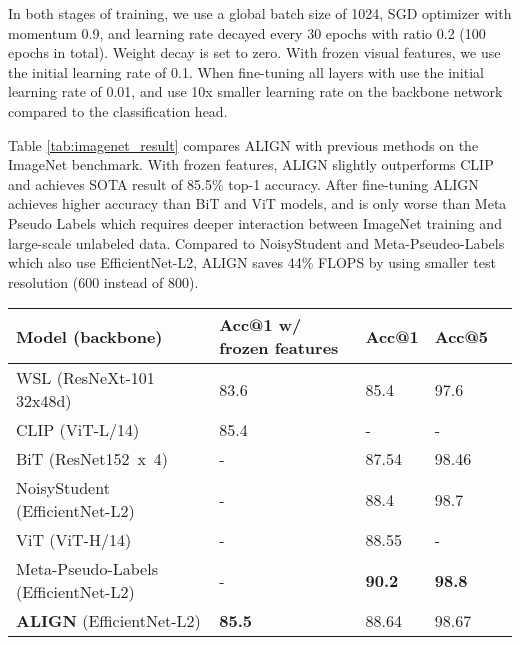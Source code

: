 \documentclass{article}
\begin{document}
In both stages of training, we use a global batch size of 1024, SGD optimizer with momentum 0.9, and learning rate decayed every 30 epochs with ratio 0.2 (100 epochs in total). Weight decay is set to zero. With frozen visual features, we use the initial learning rate of 0.1. When fine-tuning all layers with use the initial learning rate of 0.01, and use 10x smaller learning rate on the  backbone network compared to the classification head.

Table \ref{tab:imagenet_result} compares ALIGN with previous methods on the ImageNet benchmark. With frozen features, ALIGN slightly outperforms CLIP and achieves SOTA result of 85.5\% top-1 accuracy. After fine-tuning ALIGN achieves higher accuracy than BiT and ViT models, and is only worse than Meta Pseudo Labels which requires deeper interaction between ImageNet training and large-scale unlabeled data. Compared to NoisyStudent and Meta-Pseudeo-Labels which also use EfficientNet-L2, ALIGN saves 44\% FLOPS by using smaller test resolution (600 instead of 800).

\begin{table*}[h]
\begin{center}
\caption{ImageNet classification results. ALIGN is compared with WSL~\cite{mahajan:wsl}, CLIP~\cite{radford:clip}, BiT~\cite{kolensnikov:bit}, ViT~\cite{dosovitskiy:vit}, NoisyStudent~\cite{xie:noisy_student}, and Meta-Pseudo-Labels~\cite{pham:mpl}.}
\label{tab:imagenet_result}
\begin{small}
\begin{tabular}{l|llll}
\toprule
Model (backbone) & Acc@1 w/ frozen features & Acc@1 & Acc@5\\
\midrule
WSL (ResNeXt-101 32x48d) & 83.6 & 85.4 & 97.6 \\
CLIP (ViT-L/14) & 85.4 & - & - \\
BiT (ResNet152~x~4) & - & 87.54 & 98.46 \\
NoisyStudent (EfficientNet-L2) & - & 88.4 & 98.7 \\
ViT (ViT-H/14) & - & 88.55 & - \\
Meta-Pseudo-Labels (EfficientNet-L2) & - & \textbf{90.2} & \textbf{98.8} \\
\textbf{ALIGN} (EfficientNet-L2) & \textbf{85.5} & 88.64 & 98.67 \\ 
\bottomrule
\end{tabular}
\end{small}
\end{center}
\vskip -0.1in
\end{table*}
\end{document}
